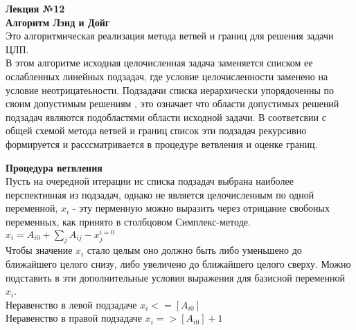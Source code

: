\LARGE{ \textbf {Лекция №12}}\\
\Large{ \textbf {Алгоритм Лэнд и Дойг}}\\
Это алгоритмическая реализация метода ветвей и границ для решения задачи ЦЛП.\\
В этом алгоритме исходная целочисленная задача заменяется списком ее ослабленных линейных подзадач,
где условие целочисленности заменено на условие неотрицатеьности.
Подзадачи списка иерархически упорядоченны по своим допустимым решениям ,
это означает что области допустимых решений  подзадач являются подобластями области исходной задачи.
В соответсвии с общей схемой метода ветвей и границ список эти подзадач рекурсивно формируется  и расссматривается
в процедуре ветвления и оценке границ.

\textbf{Процедура ветвления }\\
Пусть на очередной итерации ис списка подзадач выбрана наиболее перспективная из подзадач,
однако не является целочисленным по одной переменной, $x_i$ - эту перменную можно выразить через отрицание свобоных переменных,
как принято в столбцовом Симплекс-методе.\\
$x_i = A_{i0} + \sum \limits_j A_{ij}-x_j^{i=0}$\\

Чтобы значение $x_i$ стало целым оно должно быть либо уменьшено до ближайшего целого снизу, либо увеличено до ближайшего целого сверху.
Можно подставить в эти дополнительные условия выражения для базисной переменной $x_i$.\\
Неравенство в левой подзадаче $x_i <= [A_{i0}]$\\
Неравенство в правой подзадаче $x_i => [A_{i0}] + 1$\\

